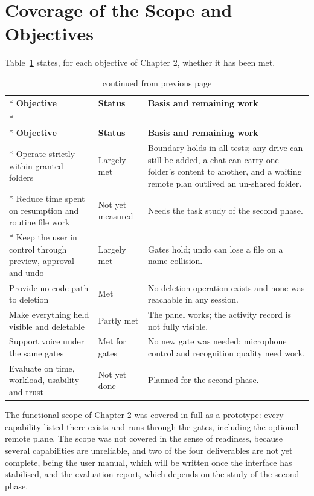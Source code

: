 \documentclass{FastFyp}
\begin{document}
\section{Coverage of the Scope and Objectives}
Table~\ref{tab:objectives} states, for each objective of Chapter 2, whether it has been met.

{\small
{}
\begin{longtable}{|p{4.6cm}|p{2.3cm}|p{7.3cm}|}
\caption{Status of the project objectives.}\label{tab:objectives}\\*
\hline
\textbf{Objective} & \textbf{Status} & \textbf{Basis and remaining work} \\*
\hline
\endfirsthead
\caption[]{continued from previous page}\\*
\hline
\textbf{Objective} & \textbf{Status} & \textbf{Basis and remaining work} \\*
\hline
\endhead
\hline
Operate strictly within granted folders & Largely met & Boundary holds in all tests; any drive can still be added, a chat can carry one folder's content to another, and a waiting remote plan outlived an un-shared folder. \\*
\hline
Reduce time spent on resumption and routine file work & Not yet measured & Needs the task study of the second phase. \\*
\hline
Keep the user in control through preview, approval and undo & Largely met & Gates hold; undo can lose a file on a name collision. \\
\hline
Provide no code path to deletion & Met & No deletion operation exists and none was reachable in any session. \\
\hline
Make everything held visible and deletable & Partly met & The panel works; the activity record is not fully visible. \\
\hline
Support voice under the same gates & Met for gates & No new gate was needed; microphone control and recognition quality need work. \\
\hline
Evaluate on time, workload, usability and trust & Not yet done & Planned for the second phase. \\
\hline
\end{longtable}
}

The functional scope of Chapter 2 was covered in full as a prototype: every capability listed there exists and runs through the gates, including the optional remote plane. The scope was not covered in the sense of readiness, because several capabilities are unreliable, and two of the four deliverables are not yet complete, being the user manual, which will be written once the interface has stabilised, and the evaluation report, which depends on the study of the second phase.
\end{document}
